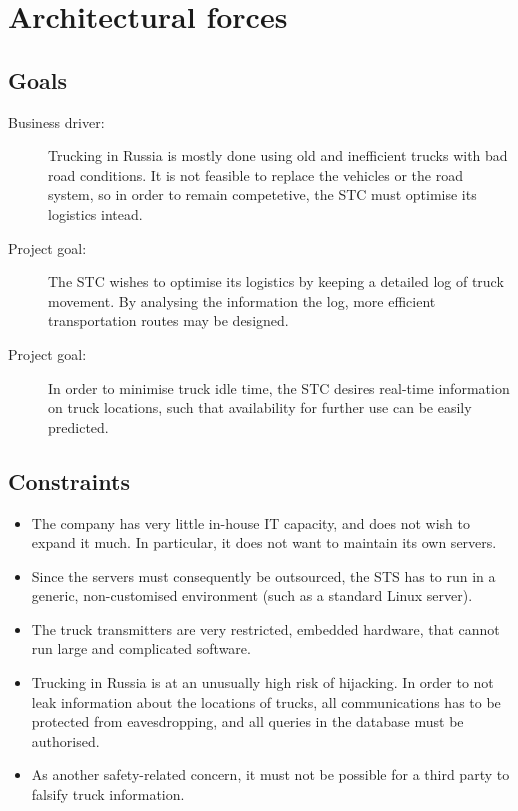 \documentclass[a4paper,11pt]{report}
\begin{document}
\chapter{Architectural forces}
\label{cha:architectural-forces}
\thispagestyle{fancy}

\section{Goals}
\label{sec:goals}

\begin{description}
\item[Business driver:] Trucking in Russia is mostly done using old and inefficient
  trucks with bad road conditions.  It is not feasible to replace the
  vehicles or the road system, so in order to remain competetive, the
  STC must optimise its logistics intead.
\item[Project goal:] The STC wishes to optimise its logistics by
  keeping a detailed log of truck movement.  By analysing the
  information the log, more efficient transportation routes may be
  designed.
\item[Project goal:] In order to minimise truck idle time, the STC
  desires real-time information on truck locations, such that
  availability for further use can be easily predicted.
\end{description}

\section{Constraints}
\label{sec:constraints}

\begin{itemize}
\item The company has very little in-house IT capacity, and does not
  wish to expand it much.  In particular, it does not want to maintain
  its own servers.
\item Since the servers must consequently be outsourced, the STS has
  to run in a generic, non-customised environment (such as a standard
  Linux server).
\item The truck transmitters are very restricted, embedded hardware,
  that cannot run large and complicated software.
\item Trucking in Russia is at an unusually high risk of hijacking.
  In order to not leak information about the locations of trucks, all
  communications has to be protected from eavesdropping, and all
  queries in the database must be authorised.
\item As another safety-related concern, it must not be possible for a
  third party to falsify truck information.
\end{itemize}
\end{document}
